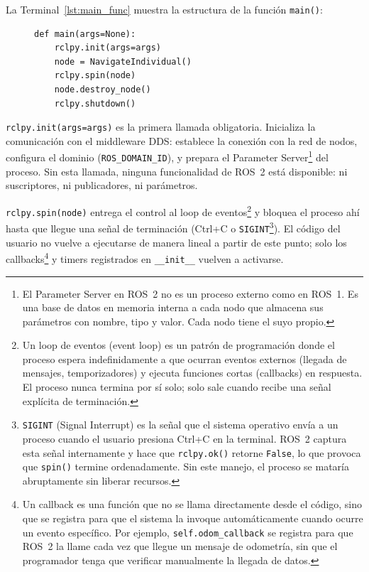 La Terminal~\ref{lst:main_func} muestra la estructura de la función \texttt{main()}:

\begin{figure}[H]
\centering
\begin{lstlisting}[style=python, caption={Función \texttt{main()} típica de un nodo ROS~2.}, label={lst:main_func}]
def main(args=None):
    rclpy.init(args=args)
    node = NavigateIndividual()
    rclpy.spin(node)
    node.destroy_node()
    rclpy.shutdown()
\end{lstlisting}
\end{figure}

\texttt{rclpy.init(args=args)} es la primera llamada obligatoria. Inicializa la comunicación con el middleware DDS: establece la conexión con la red de nodos, configura el dominio (\texttt{ROS\_DOMAIN\_ID}), y prepara el Parameter Server\footnote{El Parameter Server en ROS~2 no es un proceso externo como en ROS~1. Es una base de datos en memoria interna a cada nodo que almacena sus parámetros con nombre, tipo y valor. Cada nodo tiene el suyo propio.} del proceso. Sin esta llamada, ninguna funcionalidad de ROS~2 está disponible: ni suscriptores, ni publicadores, ni parámetros.

\texttt{rclpy.spin(node)} entrega el control al loop de eventos\footnote{Un loop de eventos (event loop) es un patrón de programación donde el proceso espera indefinidamente a que ocurran eventos externos (llegada de mensajes, temporizadores) y ejecuta funciones cortas (callbacks) en respuesta. El proceso nunca termina por sí solo; solo sale cuando recibe una señal explícita de terminación.} y bloquea el proceso ahí hasta que llegue una señal de terminación (Ctrl+C o \texttt{SIGINT}\footnote{\texttt{SIGINT} (Signal Interrupt) es la señal que el sistema operativo envía a un proceso cuando el usuario presiona Ctrl+C en la terminal. ROS~2 captura esta señal internamente y hace que \texttt{rclpy.ok()} retorne \texttt{False}, lo que provoca que \texttt{spin()} termine ordenadamente. Sin este manejo, el proceso se mataría abruptamente sin liberar recursos.}). El código del usuario no vuelve a ejecutarse de manera lineal a partir de este punto; solo los callbacks\footnote{Un callback es una función que no se llama directamente desde el código, sino que se registra para que el sistema la invoque automáticamente cuando ocurre un evento específico. Por ejemplo, \texttt{self.odom\_callback} se registra para que ROS~2 la llame cada vez que llegue un mensaje de odometría, sin que el programador tenga que verificar manualmente la llegada de datos.} y timers registrados en \texttt{\_\_init\_\_} vuelven a activarse.

